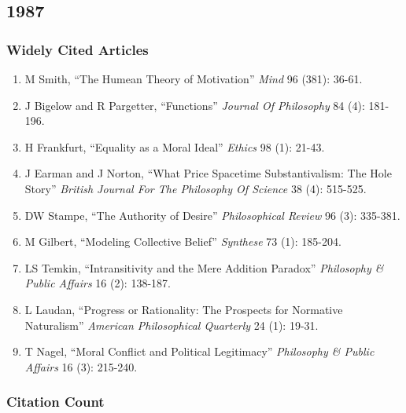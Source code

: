 \documentclass[
  10pt,
  letterpaper,
  DIV=11,
  numbers=noendperiod,
  twoside]{scrartcl}
\providecommand{\tightlist}{%
  \setlength{\itemsep}{0pt}\setlength{\parskip}{0pt}}\usepackage{longtable,booktabs,array}
\begin{document}
\newpage

\subsection{1987}\label{section-11}

\subsubsection*{Widely Cited Articles}\label{widely-cited-articles-11}

\begin{enumerate}
\def\labelenumi{\arabic{enumi}.}
\tightlist
\item
  M Smith, ``The Humean Theory of Motivation'' \emph{Mind} 96 (381):
  36-61.
\item
  J Bigelow and R Pargetter, ``Functions'' \emph{Journal Of Philosophy}
  84 (4): 181-196.
\item
  H Frankfurt, ``Equality as a Moral Ideal'' \emph{Ethics} 98 (1):
  21-43.
\item
  J Earman and J Norton, ``What Price Spacetime Substantivalism: The
  Hole Story'' \emph{British Journal For The Philosophy Of Science} 38
  (4): 515-525.
\item
  DW Stampe, ``The Authority of Desire'' \emph{Philosophical Review} 96
  (3): 335-381.
\item
  M Gilbert, ``Modeling Collective Belief'' \emph{Synthese} 73 (1):
  185-204.
\item
  LS Temkin, ``Intransitivity and the Mere Addition Paradox''
  \emph{Philosophy \& Public Affairs} 16 (2): 138-187.
\item
  L Laudan, ``Progress or Rationality: The Prospects for Normative
  Naturalism'' \emph{American Philosophical Quarterly} 24 (1): 19-31.
\item
  T Nagel, ``Moral Conflict and Political Legitimacy'' \emph{Philosophy
  \& Public Affairs} 16 (3): 215-240.
\end{enumerate}

\subsubsection*{Citation Count}\label{citation-count-11}
\end{document}
